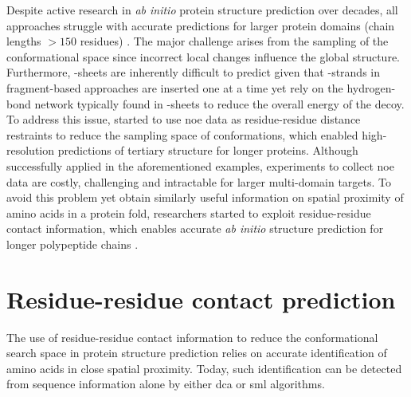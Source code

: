 Despite active research in \textit{ab initio} protein structure prediction over decades, all approaches struggle with accurate predictions for larger protein domains (chain lengths $>150$ residues) \cite{Bradley2005-lw,Tai2014-rz,He2013-gm,Kinch2011-py}. The major challenge arises from the sampling of the conformational space since incorrect local changes influence the global structure. Furthermore, \textbeta-sheets are inherently difficult to predict given that \textbeta-strands in fragment-based approaches are inserted one at a time yet rely on the hydrogen-bond network typically found in \textbeta-sheets to reduce the overall energy of the decoy. To address this issue, \textcite{Lange2012-yh,Raman2010-xv,Gobl2014-gc} started to use \gls{noe} data as residue-residue distance restraints to reduce the sampling space of conformations, which enabled high-resolution predictions of tertiary structure for longer proteins. Although successfully applied in the aforementioned examples, experiments to collect \gls{noe} data are costly, challenging and intractable for larger multi-domain targets. To avoid this problem yet obtain similarly useful information on spatial proximity of amino acids in a protein fold, researchers started to exploit residue-residue contact information, which enables accurate \textit{ab initio} structure prediction for longer polypeptide chains \cite[e.g.,][]{Marks2011-os,Michel2014-eg,Kosciolek2014-bt,Ovchinnikov2015-tn,Ovchinnikov2016-jj,Michel2017-xh,De_Oliveira2017-sg,Ovchinnikov2017-nd,Wang2017-rx}.

%
%

\section{Residue-residue contact prediction} \label{sec:introduction_contact_prediction}
The use of residue-residue contact information to reduce the conformational search space in protein structure prediction relies on accurate identification of amino acids in close spatial proximity. Today, such identification can be detected from sequence information alone by either \gls{dca} or \gls{sml} algorithms.


